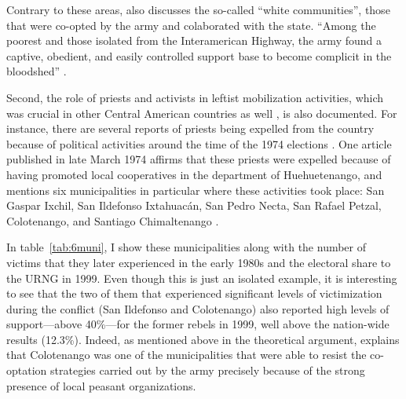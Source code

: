 \documentclass[12pt, notitlepage]{article}
\begin{document}
Contrary to these areas, \citet{Esparza:2018uw} also discusses the so-called ``white communities'', those that were co-opted by the army and colaborated with the state.
``Among the poorest and those isolated from the Interamerican Highway, the army found a captive, obedient, and easily controlled support base to become complicit in the bloodshed'' \citet[138]{Esparza:2018uw}.


Second, the role of priests and activists in leftist mobilization activities, which was crucial in other Central American countries as well \citep{Wood:2003aa}, is also documented.
For instance, there are several reports of priests being expelled from the country because of political activities around the time of the 1974 elections \citep{Imparcial:1974ab, Imparcial:1974uz}.
One article published in late March 1974 affirms that these priests were expelled because of having promoted local cooperatives in the department of Huehuetenango, and mentions six municipalities in particular where these activities took place: San Gaspar Ixchil, San Ildefonso Ixtahuacán, San Pedro Necta, San Rafael Petzal, Colotenango, and Santiago Chimaltenango \citep{Imparcial:1974aa}.

In table~\ref{tab:6muni}, I show these municipalities along with the number of victims that they later experienced in the early 1980s and the electoral share to the URNG in 1999.
Even though this is just an isolated example, it is interesting to see that the two of them that experienced significant levels of victimization during the conflict (San Ildefonso and Colotenango) also reported high levels of support---above 40\%---for the former rebels in 1999, well above the nation-wide results (12.3\%).
Indeed, as mentioned above in the theoretical argument, \citet[223--226]{Kobrak:2013aa} explains that Colotenango was one of the municipalities that were able to resist the co-optation strategies carried out by the army precisely because of the strong presence of local peasant organizations.
\end{document}
